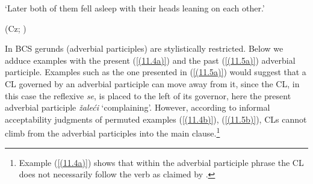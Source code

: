 \begin{exe}\ex
\begin{xlist}
\end{xlist}
\glt ‘Later both of them fell asleep with their heads leaning on each other.’ \\
\strut\hfill (Cz; \citealt[70]{Junghanns02})
\end{exe}


\noindent In BCS gerunds (adverbial participles) are stylistically restricted. Below we adduce examples with the present (\ref{(11.4a)}) and the past (\ref{(11.5a)}) adverbial participle. Examples such as the one presented in (\ref{(11.5a)}) would suggest that a CL governed by an adverbial participle can move away from it, since the CL, in this case the reflexive \textit{se}, is placed to the left of its governor, here the present adverbial participle \textit{žaleći} ‘complaining’. However, according to informal acceptability judgments of permuted examples (\ref{(11.4b)}), (\ref{(11.5b)}), CLs cannot climb from the adverbial participles into the main clause.\footnote{Example (\ref{(11.4a)}) shows that within the adverbial participle phrase the CL does not necessarily follow the verb as claimed by \citet[446f]{CavarWilder94}.}


